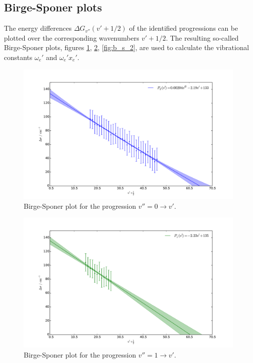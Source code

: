 \FloatBarrier

\subsection{Birge-Sponer plots}
The energy differences $\Delta G_{v''}(v' + 1/2)$ of the identified progressions can 
be plotted over the corresponding wavenumbers $v' + 1/2$. The resulting so-called 
Birge-Sponer plots, figures 
\ref{fig:b_s_0},  \ref{fig:b_s_1},  \ref{fig:b_s_2}, 
are used to calculate the vibrational constants $\omega_e'$ and $\omega_e' x_e'$. 

\begin{figure}
    \centering
    \includegraphics[width=\pltw]{analysis/figures/b_s_0.pdf}
    \caption{Birge-Sponer plot for the progression $v'' = 0 \rightarrow v'$.  
    }
    \label{fig:b_s_0}
\end{figure}

\begin{figure}
    \centering
    \includegraphics[width=\pltw]{analysis/figures/b_s_1.pdf}
    \caption{Birge-Sponer plot for the progression $v'' = 1 \rightarrow v'$.  
    }
    \label{fig:b_s_1}
\end{figure}

